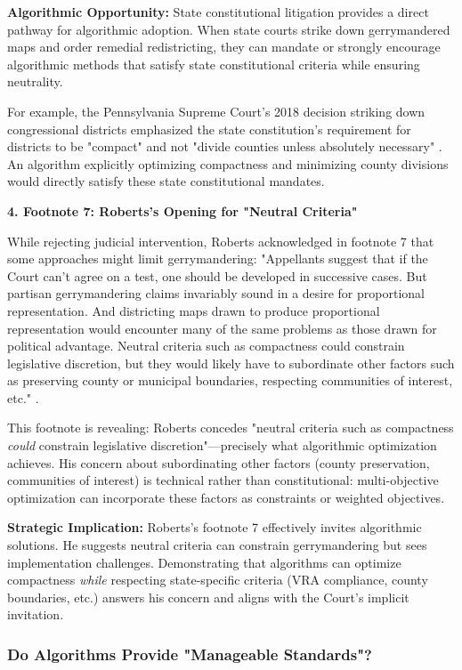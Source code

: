 \textbf{Algorithmic Opportunity:} State constitutional litigation provides a direct pathway for algorithmic adoption. When state courts strike down gerrymandered maps and order remedial redistricting, they can mandate or strongly encourage algorithmic methods that satisfy state constitutional criteria while ensuring neutrality.

For example, the Pennsylvania Supreme Court's 2018 decision striking down congressional districts emphasized the state constitution's requirement for districts to be "compact" and not "divide counties unless absolutely necessary" \citep{pennsylvania2018}. An algorithm explicitly optimizing compactness and minimizing county divisions would directly satisfy these state constitutional mandates.

\textbf{4. Footnote 7: Roberts's Opening for "Neutral Criteria"}

While rejecting judicial intervention, Roberts acknowledged in footnote 7 that some approaches might limit gerrymandering: "Appellants suggest that if the Court can't agree on a test, one should be developed in successive cases. But partisan gerrymandering claims invariably sound in a desire for proportional representation. And districting maps drawn to produce proportional representation would encounter many of the same problems as those drawn for political advantage. Neutral criteria such as compactness could constrain legislative discretion, but they would likely have to subordinate other factors such as preserving county or municipal boundaries, respecting communities of interest, etc." \citep{rucho2019}.

This footnote is revealing: Roberts concedes "neutral criteria such as compactness \textit{could} constrain legislative discretion"—precisely what algorithmic optimization achieves. His concern about subordinating other factors (county preservation, communities of interest) is technical rather than constitutional: multi-objective optimization can incorporate these factors as constraints or weighted objectives.

\textbf{Strategic Implication:} Roberts's footnote 7 effectively invites algorithmic solutions. He suggests neutral criteria can constrain gerrymandering but sees implementation challenges. Demonstrating that algorithms can optimize compactness \textit{while} respecting state-specific criteria (VRA compliance, county boundaries, etc.) answers his concern and aligns with the Court's implicit invitation.

\subsubsection{Do Algorithms Provide "Manageable Standards"?}

